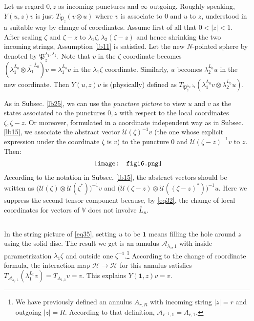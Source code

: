 \documentclass[11pt,b5paper,notitlepage]{article}
\theoremstyle{definition}
\theoremstyle{plain}
\newcommand{\fk}{\mathfrak}
\newcommand{\mc}{\mathcal}
\newcommand{\ovl}{\overline}
\newcommand{\id}{\mathbf{1}}
\newcommand{\Vbb}{\mathbb V}
\numberwithin{equation}{section}
\begin{document}
Let us regard $0,z$ as incoming punctures and $\infty$ outgoing. Roughly speaking, $Y(u,z)v$ is just $T_{\fk P_z}(v\otimes u)$ where $v$ is associate to $0$ and $u$ to $z$, understood in a suitable way by change of coordinates. Assume first of all that $0<|z|<1$. After scaling $\zeta$ and $\zeta-z$ to $\lambda_1\zeta,\lambda_2(\zeta-z)$ and hence shrinking the two incoming strings, Assumption \ref{lb11} is satisfied. Let the new $N$-pointed sphere by denoted by $\fk P_z^{\lambda_1,\lambda_2}$. Note that $v$ in the $\zeta$ coordinate becomes $(\lambda_1^{L_0}\otimes\ovl{\lambda_1}^{\ovl L_0})v=\lambda_1^{L_0}v$ in the $\lambda_1\zeta$ coordinate. Similarly, $u$ becomes $\lambda_2^{L_0}u$ in the new coordinate. Then $Y(u,z)v$ is (physically) defined as $T_{\fk P_z^{\lambda_1,\lambda_2}}(\lambda_1^{L_0} v\otimes \lambda_2^{L_0}u)$. 

As in Subsec. \ref{lb25}, we can use the \emph{puncture picture} to view $u$ and $v$ as the states associated to the punctures $0,z$ with respect to the local coordinates $\zeta,\zeta-z$. Or moreover, formulated in a coordinate independent way as in Subsec. \ref{lb15}, we associate the abstract vector $\mc U(\zeta)^{-1}v$ (the one whose explicit expression under the coordinate $\zeta$ is $v$) to the puncture $0$ and $\mc U(\zeta-z)^{-1}v$ to $z$. Then:
\begin{align}
	\vcenter{\hbox{{
				\texttt{[image: fig16.png]}}}}	\label{eq35}
\end{align}
According to the notation in Subsec. \ref{lb15}, the abstract vectors should be written as $\big(\mc U(\zeta)\otimes \mc U(\zeta^*)\big)^{-1}v$ and $\big(\mc U(\zeta-z)\otimes \mc U((\zeta-z)^*)\big)^{-1}u$. Here we suppress the second tensor component because, by \eqref{eq32}, the change of local coordinates for vectors of $\Vbb$ does not involve $\ovl L_n$.


\subsection{}

In the string picture of \eqref{eq35}, setting $u$ to be $\id$ means filling the hole around $z$ using the solid disc. The result we get is an annulus $\mc A_{\lambda_1,1}$ with inside parametrization $\lambda_1\zeta$ and outside one $\zeta^{-1}$.\footnote{We have previously defined an annulus $A_{r,R}$ with incoming string $|z|=r$ and outgoing $|z|=R$. According to that definition, $\mc A_{r^{-1},1}=A_{r,1}$.} According to the change of coordinate formula, the interaction map $\mc H\rightarrow\mc H$ for this annulus satisfies $T_{\mc A_{\lambda_1,1}}(\lambda_1^{L_0}v)=T_{A_{1,1}}v=v$. This explains $Y(\id,z)v=v$.
\end{document}
